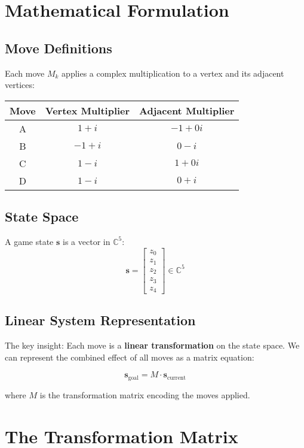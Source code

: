 \documentclass{article}
\begin{document}
\section{Mathematical Formulation}

\subsection{Move Definitions}

Each move $M_k$ applies a complex multiplication to a vertex and its adjacent vertices:

\begin{center}
\begin{tabular}{|c|c|c|}
\hline
Move & Vertex Multiplier & Adjacent Multiplier \\
\hline
A & $1 + i$ & $-1 + 0i$ \\
B & $-1 + i$ & $0 - i$ \\
C & $1 - i$ & $1 + 0i$ \\
D & $1 - i$ & $0 + i$ \\
\hline
\end{tabular}
\end{center}

\subsection{State Space}

A game state $\mathbf{s}$ is a vector in $\mathbb{C}^5$:
\[
\mathbf{s} = \begin{bmatrix} z_0 \\ z_1 \\ z_2 \\ z_3 \\ z_4 \end{bmatrix} \in \mathbb{C}^5
\]

\subsection{Linear System Representation}

The key insight: Each move is a \textbf{linear transformation} on the state space. We can represent the combined effect of all moves as a matrix equation:

\[
\mathbf{s}_{\text{goal}} = M \cdot \mathbf{s}_{\text{current}}
\]

where $M$ is the transformation matrix encoding the moves applied.

\section{The Transformation Matrix}
\end{document}
